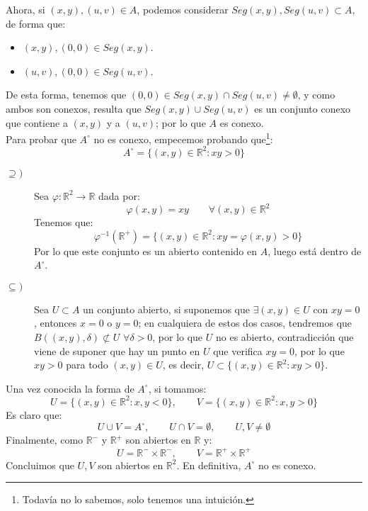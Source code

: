 \begin{ejercicio}
\noindent
Ahora, si $(x,y),(u,v)\in A$, podemos considerar $Seg(x,y),Seg(u,v)\subset A$, de forma que:
\begin{itemize}
    \item $(x,y),(0,0)\in Seg(x,y)$.
    \item $(u,v),(0,0)\in Seg(u,v)$.
\end{itemize}
De esta forma, tenemos que $(0,0)\in Seg(x,y)\cap Seg(u,v)\neq \emptyset $, y como ambos son conexos, resulta que $Seg(x,y)\cup Seg(u,v)$ es un conjunto conexo que contiene a $(x,y)$ y a $(u,v)$; por lo que $A$ es conexo.\\

\noindent
Para probar que $A^\circ$ no es conexo, empecemos probando que\footnote{Todavía no lo sabemos, solo tenemos una intuición.}:
\begin{equation*}
    A^\circ = \{(x,y)\in \mathbb{R}^2 : xy > 0\}
\end{equation*}
\begin{description}
    \item [$\supseteq)$] Sea $\varphi:\mathbb{R}^2 \to \mathbb{R}$ dada por:
        \begin{equation*}
            \varphi(x,y) = xy \qquad \forall (x,y)\in \mathbb{R}^2
        \end{equation*}
        Tenemos que:
        \begin{equation*}
            \varphi^{-1}(\mathbb{R}^+) = \{(x,y)\in \mathbb{R}^2 : xy = \varphi(x,y) > 0\}
        \end{equation*}
        Por lo que este conjunto es un abierto contenido en $A$, luego está dentro de $A^\circ$.
    \item [$\subseteq)$] Sea $U\subset A$ un conjunto abierto, si suponemos que $\exists (x,y)\in U$ con $xy = 0$, entonces $x = 0$ o $y = 0$; en cualquiera de estos dos casos, tendremos que $B((x,y),\delta) \not\subset U$ $\forall \delta>0$, por lo que $U$ no es abierto, contradicción que viene de suponer que hay un punto en $U$ que verifica $xy = 0$, por lo que $xy > 0$ para todo $(x,y)\in U$, es decir, $U\subset \{(x,y)\in \mathbb{R}^2 : xy > 0\}$.
\end{description}
Una vez conocida la forma de $A^\circ$, si tomamos:
\begin{equation*}
    U = \{(x,y)\in \mathbb{R}^2 : x,y < 0\}, \qquad V = \{(x,y)\in \mathbb{R}^2 : x,y>0\}
\end{equation*}
Es claro que:
\begin{equation*}
    U\cup V = A^\circ, \qquad U\cap V = \emptyset, \qquad U, V \neq \emptyset 
\end{equation*}
Finalmente, como $\mathbb{R}^-$ y $\mathbb{R}^+$ son abiertos en $\mathbb{R}$ y:
\begin{equation*}
    U = \mathbb{R}^- \times \mathbb{R}^-, \qquad V = \mathbb{R}^+ \times \mathbb{R}^+
\end{equation*}
Concluimos que $U,V$ son abiertos en $\mathbb{R}^2$. En definitiva, $A^\circ$ no es conexo.
\end{ejercicio}

